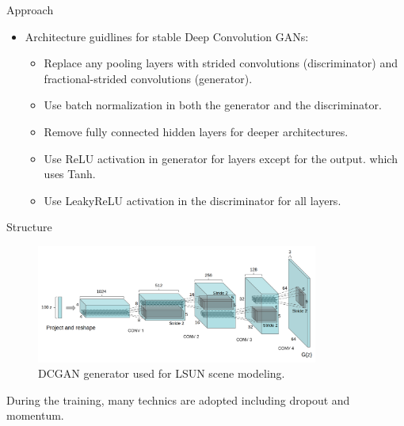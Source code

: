 \documentclass[10pt]{beamer}
\begin{document}
	\begin{frame}{Approach}
		\begin{itemize}
			\item Architecture guidlines for stable Deep Convolution GANs:
			\begin{itemize}
				\item Replace any pooling layers with strided convolutions (discriminator) and fractional-strided convolutions (generator).
				\item Use batch normalization in both the generator and the discriminator.
				\item Remove fully connected hidden layers for deeper architectures.
				\item Use ReLU activation in generator for layers except for the output. which uses Tanh.
				\item Use LeakyReLU activation in the discriminator for all layers.
			\end{itemize}
		\end{itemize}
	\end{frame}

	\begin{frame}{Structure}
		\begin{figure}
			\includegraphics[width=25em]{figures/DCGAN-generator-structure.png}
			\caption{DCGAN generator used for LSUN scene modeling.}
		\end{figure}
		During the training, many technics are adopted including dropout and momentum.
	\end{frame}
\end{document}
